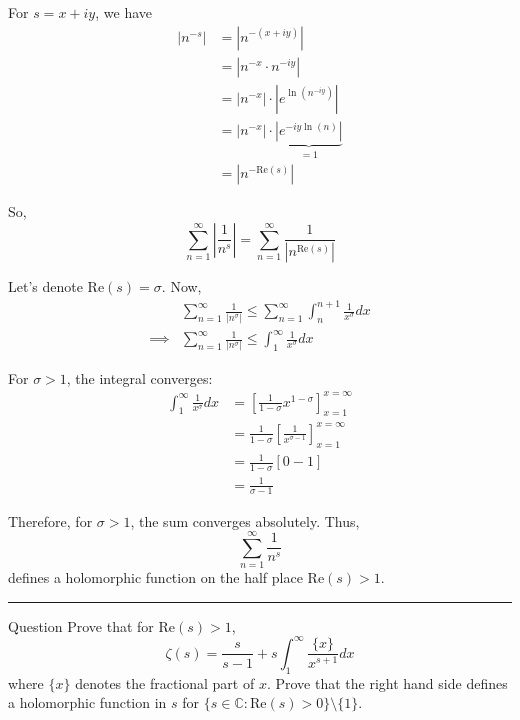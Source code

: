 \documentclass{article}
\newcommand{\C}{\mathbb{C}}
\begin{document}
For $s = x + iy$, we have 
\begin{align*}
  \left| n^{-s} \right| &= \left| n^{-(x+iy)} \right| \\
  &= \left| n^{-x} \cdot n^{-iy} \right| \\
  &= \left| n^{-x} \right| \cdot \left| e^{\ln(n^{-iy})} \right| \\
  &= \left| n^{-x} \right| \cdot \underbrace{\left| e^{-iy\ln(n)} \right|}_{=1} \\ 
  &= \left| n^{-\text{Re}(s)} \right|
\end{align*}

So, 
\[ \sum_{n = 1}^{\infty} \left|\frac{1}{n^s}\right| = \sum_{n = 1}^{\infty} \frac{1}{\left| n^{\text{Re}(s)} \right|} \]

Let's denote Re$(s) = \sigma$. Now, 
\begin{align*}
  &\sum_{n = 1}^{\infty} \frac{1}{\left| n^{\sigma} \right|} \leq \sum_{n = 1}^{\infty} \int_{n}^{n+1} \frac{1}{x^\sigma} dx \\
  \implies &\sum_{n = 1}^{\infty} \frac{1}{\left| n^{\sigma} \right|} \leq \int_{1}^{\infty} \frac{1}{x^{\sigma}} dx
\end{align*}

For $\sigma > 1$, the integral converges:
\begin{align*}
  \int_{1}^{\infty} \frac{1}{x^{\sigma}} dx &= \left[\frac{1}{1-\sigma}x^{1-\sigma}\right]_{x = 1}^{x = \infty} \\
  &= \frac{1}{1-\sigma} \left[ \frac{1}{x^{\sigma - 1}} \right]_{x = 1}^{x = \infty} \\
  &= \frac{1}{1-\sigma} \left[0 - 1\right] \\
  &= \frac{1}{\sigma - 1}
\end{align*}

Therefore, for $\sigma > 1$, the sum converges absolutely. Thus, 
\[ \sum_{n = 1}^{\infty} \frac{1}{n^s} \] defines a holomorphic function on the half place Re$(s) > 1$.

\vskip 0.5cm
\hrule 
\vskip 0.5cm

\begin{mathdefinitionbox}{Question }
\vskip 0.5cm
Prove that for Re$(s) > 1$,
\[ \zeta(s) = \frac{s}{s-1} + s\int_{1}^{\infty} \frac{\{x\}}{x^{s+1}} dx \]
where $\{x\}$ denotes the fractional part of $x$. Prove that the right hand side defines a holomorphic function in $s$ for $\{s \in \C : \text{Re}(s) > 0 \} \setminus \{1\}$.
\end{mathdefinitionbox}
\end{document}
